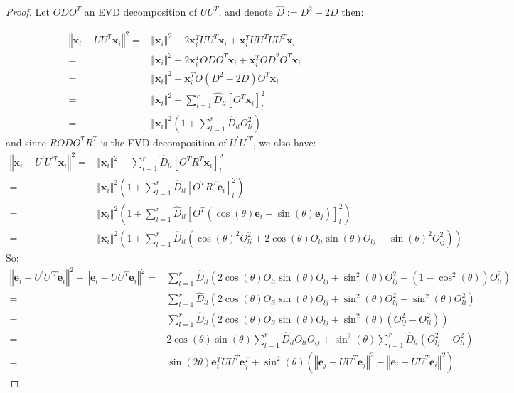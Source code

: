 \documentclass{article}
\newcommand{\x}{{\mathbf x}}
\newcommand{\e}{{\mathbf e}}
\begin{document}
\begin{proof}
Let $ODO^{T}$ an EVD decomposition of $UU^{T}$, and denote $\hat{D}:=D^{2}-2D$ then:

\begin{align*}
    \left\Vert \x_{i}-UU^{T}\x_{i}\right\Vert ^{2}=&	\left\Vert \x_{i}\right\Vert ^{2}-2\x_{i}^{T}UU^{T}\x_{i}+\x_{i}^{T}UU^{T}UU^{T}\x_{i}\\
=&	\left\Vert \x_{i}\right\Vert ^{2}-2\x_{i}^{T}ODO^{T}\x_{i}+\x_{i}^{T}OD^{2}O^{T}\x_{i}\\
=&	\left\Vert \x_{i}\right\Vert ^{2}+\x_{i}^{T}O\left(D^{2}-2D\right)O^{T}\x_{i}\\
=&	\left\Vert \x_{i}\right\Vert ^{2}+\sum_{l=1}^{r}\hat{D}_{ll}\left[O^{T}\x_{i}\right]_{l}^{2}\\
=&  \left\Vert \x_{i}\right\Vert ^{2}\left(1+\sum_{l=1}^{r}\hat{D}_{ll}O_{li}^{2}\right)
\end{align*}
and since $RODO^{T}R^T$ is the EVD decomposition of $U^{'}U^{'T}$, we also have: 
\begin{align*}
    \left\Vert \x_{i}-U^{'}U^{'T}\x_{i}\right\Vert^{2}
    =& \left\Vert \x_{i}\right\Vert^{2}+\sum_{l=1}^{r}\hat{D}_{ll}\left[O^{T}R^T\x_{i}\right]_{l}^{2}\\
    =& \left\Vert \x_{i}\right\Vert^{2}\left(1+\sum_{l=1}^{r}\hat{D}_{ll}\left[O^{T}R^T\e_{i}\right]_{l}^{2}\right)\\
    =& \left\Vert \x_{i}\right\Vert^{2}\left(1+\sum_{l=1}^{r}\hat{D}_{ll}\left[O^{T}\left(\cos\left(\theta\right)\e_{i}+\sin\left(\theta\right)\e_{j}\right)\right]_{l}^{2}\right)\\
    =& \left\Vert \x_{i}\right\Vert^{2}\left(1+\sum_{l=1}^{r}\hat{D}_{ll}\left(\cos\left(\theta\right)^2O_{li}^{2}+2\cos\left(\theta\right)O_{li}\sin\left(\theta\right)O_{lj}+\sin\left(\theta\right)^{2}O_{lj}^{2}\right)\right)
\end{align*}
So:
\begin{align*}
    \left\Vert \e_{i}-U^{'}U^{'T}\e_{i}\right\Vert ^{2}-\left\Vert \e_{i}-UU^{T}\e_{i}\right\Vert^{2}=&\sum_{l=1}^{r}\hat{D}_{ll}\left(2\cos\left(\theta\right)O_{li}\sin\left(\theta\right)O_{lj}+\sin^{2}\left(\theta\right)O_{lj}^{2}-\left(1-\cos^{2}\left(\theta\right)\right)O_{li}^{2}\right)\\
    =& \sum_{l=1}^{r}\hat{D}_{ll}\left(2\cos\left(\theta\right)O_{li}\sin\left(\theta\right)O_{lj}+\sin^{2}\left(\theta\right)O_{lj}^{2}-\sin^{2}\left(\theta\right)O_{li}^{2}\right)\\
    =& \sum_{l=1}^{r}\hat{D}_{ll}\left(2\cos\left(\theta\right)O_{li}\sin\left(\theta\right)O_{lj}+\sin^{2}\left(\theta\right)\left(O_{lj}^{2}-O_{li}^{2}\right)\right)\\
    =& 2\cos\left(\theta\right)\sin\left(\theta\right)\sum_{l=1}^{r}\hat{D}_{ll}O_{li}O_{lj}+\sin^{2}\left(\theta\right)\sum_{l=1}^{r}\hat{D}_{ll}\left(O_{lj}^{2}-O_{li}^{2}\right)\\
    =& \sin\left(2\theta\right)\e_{i}^{T}UU^{T}\e_{j}^{T}+\sin^{2}\left(\theta\right)\left(\left\Vert \e_{j}-UU^{T}\e_{j}\right\Vert^{2}-\left\Vert \e_{i}-UU^{T}\e_{i}\right\Vert ^{2}\right)
\end{align*}
\end{proof}
\end{document}

